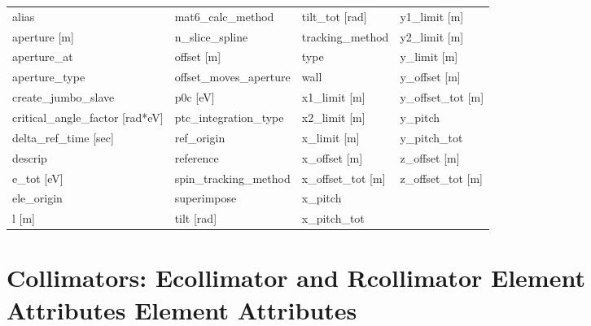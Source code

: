  \begin{tabular}{llll} \toprule
alias                          & mat6_calc_method               & tilt_tot [rad]                 & y1_limit [m]                   \\
aperture [m]                   & n_slice_spline                 & tracking_method                & y2_limit [m]                   \\
aperture_at                    & offset [m]                     & type                           & y_limit [m]                    \\
aperture_type                  & offset_moves_aperture          & wall                           & y_offset [m]                   \\
create_jumbo_slave             & p0c [eV]                       & x1_limit [m]                   & y_offset_tot [m]               \\
critical_angle_factor [rad*eV] & ptc_integration_type           & x2_limit [m]                   & y_pitch                        \\
delta_ref_time [sec]           & ref_origin                     & x_limit [m]                    & y_pitch_tot                    \\
descrip                        & reference                      & x_offset [m]                   & z_offset [m]                   \\
e_tot [eV]                     & spin_tracking_method           & x_offset_tot [m]               & z_offset_tot [m]               \\
ele_origin                     & superimpose                    & x_pitch                        &                                \\
l [m]                          & tilt [rad]                     & x_pitch_tot                    &                                \\
 \bottomrule
 \end{tabular}
 \vfill
 
 \section{Collimators: Ecollimator and Rcollimator Element Attributes
  Element Attributes}
 \label{s:list.collimator}
 
